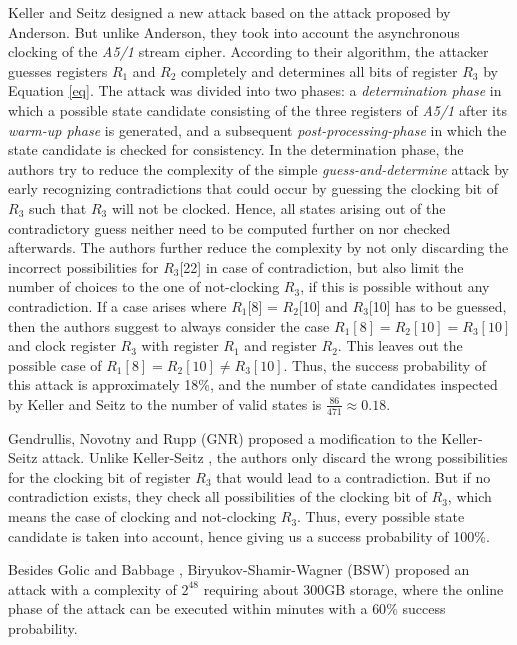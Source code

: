 \documentclass{llncs}
\begin{document}
Keller and Seitz designed a new attack \cite{[KS01]} based on the attack proposed by Anderson. But unlike Anderson, they took into account the asynchronous clocking of the \emph{A5/1} stream cipher. According to their algorithm, the attacker guesses registers $R_1$ and $R_2$ completely and determines all bits of register $R_3$ by Equation \ref{eq}. The attack was divided into two phases: a \emph{determination phase} in which a possible state candidate consisting of the three registers of \emph{A5/1} after its \emph{warm-up phase} \cite{[Bri]} is generated, and a subsequent \emph{post-processing-phase} in which the state candidate is checked for consistency. In the determination phase, the authors try to reduce the complexity of the simple \emph{guess-and-determine} attack by early recognizing contradictions that could occur by guessing the clocking bit of $R_{3}$ such that $R_{3}$ will not be clocked. Hence, all states arising out of the contradictory guess neither need to be computed further on nor checked afterwards. The authors further reduce the complexity by not only discarding the incorrect possibilities for $R_{3}$[22] in case of contradiction, but also limit the number of choices to the one of not-clocking $R_{3}$, if this is possible without any contradiction. If a case arises where $R_{1}$[8] = $R_{2}$[10] and $R_{3}$[10] has to be guessed, then the authors suggest to always consider the case $R_{1}[8] = R_{2}[10] = R_{3}[10]$ and clock register $R_{3}$ with register $R_{1}$ and register $R_{2}$. This leaves out the possible case of $R_{1}[8] = R_{2}[10] \neq R_{3}[10]$. Thus, the success probability of this attack is approximately 18\%, and the number of state candidates inspected by Keller and Seitz to the number of valid states is $\frac{86}{471} \approx 0.18$.

Gendrullis, Novotny and Rupp \cite{[Rupp]} (GNR) proposed a modification to the Keller-Seitz attack. Unlike Keller-Seitz \cite{[KS01]}, the authors only discard the wrong possibilities for the clocking bit of register $R_{3}$ that would lead to a contradiction. But if no contradiction exists, they check all possibilities of the clocking bit of $R_{3}$, which means the case of clocking and not-clocking $R_{3}$. Thus, every possible state candidate is taken into account, hence giving us a success probability of 100\%.

Besides Golic \cite{[Golic]} and Babbage \cite{[Bab]}, Biryukov-Shamir-Wagner \cite{[Bir]} (BSW) proposed an attack with a complexity of $2^{48}$ requiring about 300GB storage, where the online phase of the attack can be executed within minutes with a $60\%$ success probability. 
\end{document}
